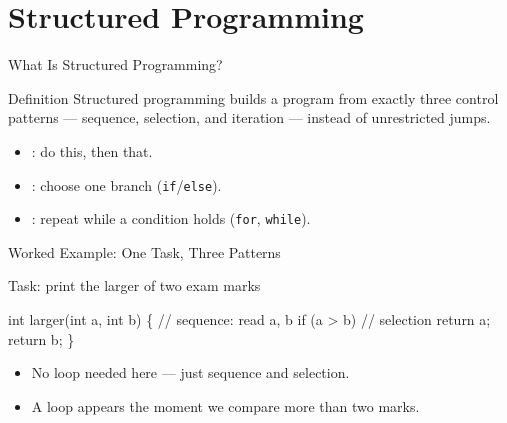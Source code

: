 \documentclass[aspectratio=169]{beamer}
\begin{document}

\section{Structured Programming}


\begin{frame}{What Is Structured Programming?}
  \begin{block}{Definition}
    Structured programming builds a program from exactly three control
    patterns --- sequence, selection, and iteration --- instead of
    unrestricted jumps.
  \end{block}
  \begin{itemize}
    \item {}: do this, then that.
    \item {}: choose one branch (\texttt{if}/\texttt{else}).
    \item {}: repeat while a condition holds (\texttt{for},
      \texttt{while}).
  \end{itemize}
\end{frame}

\begin{frame}[fragile]{Worked Example: One Task, Three Patterns}
  \begin{block}{Task: print the larger of two exam marks}
\begin{semiverbatim}
int larger(int a, int b) \{     \textcolor{neutral}{// sequence: read a, b}
  if (a > b)                   \textcolor{neutral}{// selection}
    return a;
  return b;
\}
\end{semiverbatim}
  \end{block}
  \begin{itemize}
    \item No loop needed here --- just sequence and selection.
    \item A loop appears the moment we compare more than two marks.
  \end{itemize}
\end{frame}
\end{document}
